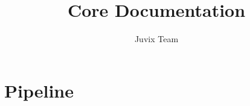 \documentclass[acmsmall]{acmart}
\numberwithin{figure}{subsection}
\begin{document}
\title{Core Documentation}

%
\author{Juvix Team}

%

%
%
\maketitle
\thispagestyle{empty}
\tableofcontents
\clearpage

\section{Pipeline}
\end{document}
